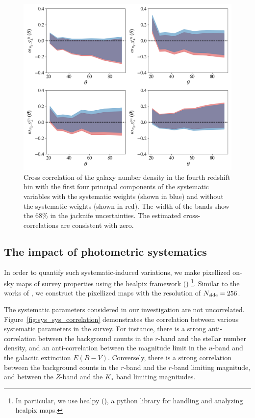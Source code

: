 \documentclass[fleqn,usenatbib,useAMS]{mnras}
\begin{document}
\begin{figure}
    \includegraphics[width = \textwidth]{figures_tmp/sys/cross_60.png}
    \caption{Cross correlation of the galaxy number density in the fourth redshift bin with the first four principal components of the systematic variables with the systematic weights (shown in blue) and without the systematic weights (shown in red). The width of the bands show the 68\% in the jacknife uncertainties. The estimated cross-correlations are consistent with zero.}
    \label{fig:cross-correlation}
\end{figure}


\subsection{The impact of photometric systematics}

In order to quantify such systematic-induced variations, we make pixellized on-sky maps of survey properties using the healpix framework (\citealt{healpix}) \footnote{In particular, we use healpy (\citealt{healpy2019}), a python library for handling and analyzing healpix maps.}. Similar to the works of \citet{ross2017, rezaie2019}, we construct the pixellized maps with the resolution of $N_{\rm side} = 256$. 

The systematic parameters considered in our investigation are not uncorrelated. Figure~\ref{fig:sys_sys_correlation} demonstrates the correlation between various systematic parameters in the survey. For instance, there is a strong anti-correlation between the background counts in the $r$-band and the stellar number density, and an anti-correlation between the magnitude limit in the $u$-band and the galactic extinction $E(B-V)$. Conversely, there is a strong correlation between the background counts in the $r$-band and the $r$-band limiting magnitude, and between the $Z$-band and the $K_{\rm s}$ band limiting magnitudes. 
\end{document}
